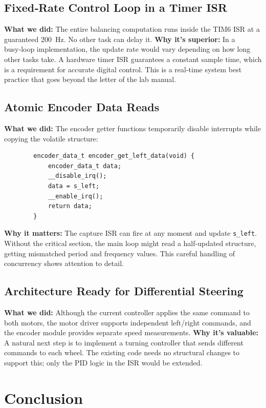 \documentclass[12pt,a4paper]{article}
\begin{document}
	\subsection{Fixed‑Rate Control Loop in a Timer ISR}
	\textbf{What we did:} The entire balancing computation runs inside the TIM6 ISR at a guaranteed \SI{200}{\hertz}. No other task can delay it.  
	\textbf{Why it’s superior:} In a busy‑loop implementation, the update rate would vary depending on how long other tasks take. A hardware timer ISR guarantees a constant sample time, which is a requirement for accurate digital control. This is a real‑time system best practice that goes beyond the letter of the lab manual.
	
	\subsection{Atomic Encoder Data Reads}
	\textbf{What we did:} The encoder getter functions temporarily disable interrupts while copying the volatile structure:  
	\begin{lstlisting}
		encoder_data_t encoder_get_left_data(void) {
			encoder_data_t data;
			__disable_irq();
			data = s_left;
			__enable_irq();
			return data;
		}
	\end{lstlisting}
	\textbf{Why it matters:} The capture ISR can fire at any moment and update \texttt{s\_left}. Without the critical section, the main loop might read a half‑updated structure, getting mismatched period and frequency values. This careful handling of concurrency shows attention to detail.
	
	\subsection{Architecture Ready for Differential Steering}
	\textbf{What we did:} Although the current controller applies the same command to both motors, the motor driver supports independent left/right commands, and the encoder module provides separate speed measurements.  
	\textbf{Why it’s valuable:} A natural next step is to implement a turning controller that sends different commands to each wheel. The existing code needs no structural changes to support this; only the PID logic in the ISR would be extended.
	
	\section{Conclusion}
	\label{sec:conclusion}
	
\end{document}
